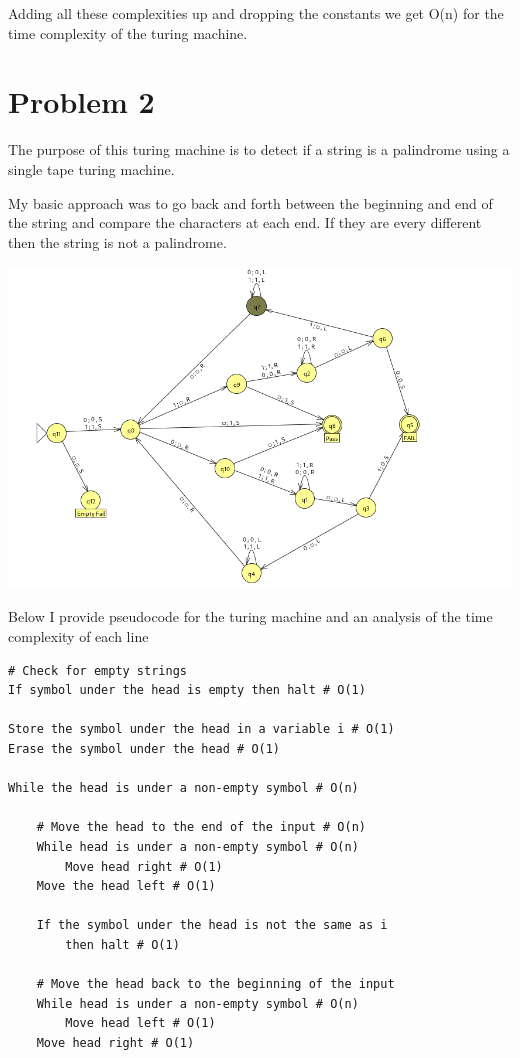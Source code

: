 \documentclass[12pt]{article}
\begin{document}
Adding all these complexities up and dropping the constants we get O(n) for the time complexity of the turing machine.


\section{Problem 2}
The purpose of this turing machine is to detect if a string is a palindrome using a single tape turing machine.

My basic approach was to go back and forth between the beginning and end of the string and compare the characters at each end. If they are every different then the string is not a palindrome.

\includegraphics[width=\textwidth]{problem2.png}

Below I provide pseudocode for the turing machine and an analysis of the time complexity of each line

\begin{lstlisting}[basicstyle=\small, tabsize=2]
# Check for empty strings
If symbol under the head is empty then halt # O(1)

Store the symbol under the head in a variable i # O(1)
Erase the symbol under the head # O(1)

While the head is under a non-empty symbol # O(n)

	# Move the head to the end of the input # O(n)
	While head is under a non-empty symbol # O(n)
		Move head right # O(1)
	Move the head left # O(1)

	If the symbol under the head is not the same as i
		then halt # O(1)

	# Move the head back to the beginning of the input
	While head is under a non-empty symbol # O(n)
		Move head left # O(1)
	Move head right # O(1)
\end{lstlisting}
\end{document}
